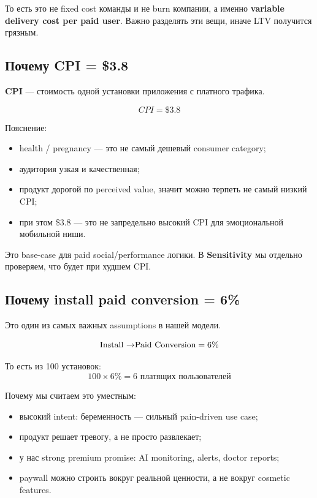 \documentclass[10pt,a4paper]{article}
\begin{document}
То есть это не fixed cost команды и не burn компании, а именно \textbf{variable delivery cost per paid user}. Важно разделять эти вещи, иначе LTV получится грязным.

\subsection{Почему CPI = \$3.8}

\textbf{CPI} --- стоимость одной установки приложения с платного трафика.

\begin{softbox}
\[
CPI = \$3.8
\]
\end{softbox}

Пояснение:
\begin{itemize}
    \item health / pregnancy --- это не самый дешевый consumer category;
    \item аудитория узкая и качественная;
    \item продукт дорогой по perceived value, значит можно терпеть не самый низкий CPI;
    \item при этом \$3.8 --- это не запредельно высокий CPI для эмоциональной мобильной ниши.
\end{itemize}

Это base-case для paid social/performance логики. В \textbf{Sensitivity} мы отдельно проверяем, что будет при худшем CPI.

\subsection{Почему install \textrightarrow paid conversion = 6\%}

Это один из самых важных assumptions в нашей модели.

\begin{greenbox}
\[
\text{Install \textrightarrow Paid Conversion} = 6\%
\]
\end{greenbox}

То есть из 100 установок:
\[
100 \times 6\% = 6 \text{ платящих пользователей}
\]

Почему мы считаем это уместным:
\begin{itemize}
    \item высокий intent: беременность --- сильный pain-driven use case;
    \item продукт решает тревогу, а не просто развлекает;
    \item у нас strong premium promise: AI monitoring, alerts, doctor reports;
    \item paywall можно строить вокруг реальной ценности, а не вокруг cosmetic features.
\end{itemize}
\end{document}
